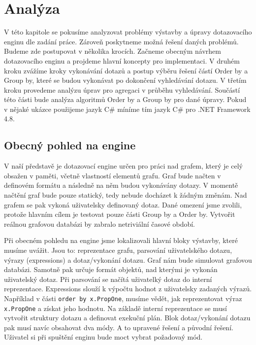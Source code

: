 

\chapter{Analýza}

V této kapitole se pokusíme analyzovat problémy výstavby a úpravy dotazovacího enginu dle zadání práce.
Zároveň poskytneme možná řešení daných problémů.
Budeme zde postupovat v několika krocích. 
Začneme obecným návrhem dotazovacího enginu a projdeme hlavní koncepty pro implementaci.
V druhém kroku zvážíme kroky vykonávání dotazů a postup výběru řešení částí Order by a Group by, které se budou vykonávat po dokončení vyhledávání dotazu.
V třetím kroku provedeme analýzu úprav pro agregaci v průběhu vyhledávání. 
Součástí této části bude analýza algoritmů Order by a Group by pro dané úpravy. 
Pokud v nějaké ukázce použijeme jazyk C\# míníme tím jazyk C\# pro .NET Framework 4.8.

\section{Obecný pohled na engine}

V naší představě je dotazovací engine určen pro práci nad grafem, který je celý obsažen v paměti, včetně vlastností elementů grafu.
Graf bude načten v definovém formátu a následně na něm budou vykonávány dotazy.
V momentě načtění graf bude pouze statický, tedy nebude docházet k žádným změnám.
Nad grafem se pak vykoná uživatelsky definovaný dotaz.
Dané omezení jsme zvolili, protože hlavním cílem je testovat pouze části Group by a Order by.
Vytvořit reálnou grafovou databázi by zabralo netriviální časové období.

Při obecném pohledu na engine jsme lokalizovali hlavní bloky výstavby, které musíme uvážit.
Jsou to: reprezentace grafu, parsování uživatelského dotazu, výrazy (expressions) a dotaz/vykonání dotazu.
Graf nám bude simulovat grafovou databázi. 
Samotně pak určuje formát objektů, nad kterými je vykonán uživatelský dotaz.
Při parsování se načítá uživatelký dotaz do interní reprezentace.
Expressions slouží k výpočtu hodnot z uživatelsky zadaných výrazů.
Například v části \texttt{order by x.PropOne}, musíme vědět, jak reprezentovat výraz \texttt{x.PropOne} a získat jeho hodnotu. 
Na základě interní reprezentace se musí vytvořit struktury dotazu a definovat exekuční plán. 
Blok dotaz/vykonání dotazu pak musí navíc obsahovat dva módy.
A to upravené řešení a původní řešení.
Uživatel si při spuštění enginu bude moct vybrat požadovaý mód.

